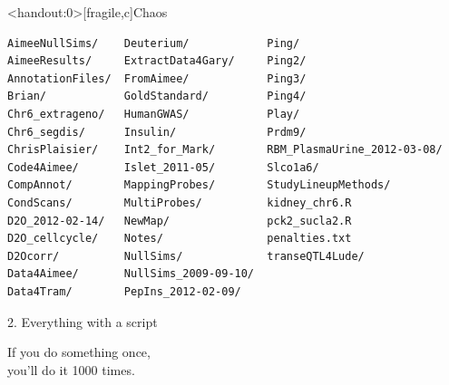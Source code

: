 \documentclass[12pt,t]{beamer}
\begin{document}
\begin{frame}<handout:0>[fragile,c]{Chaos}

\addtocounter{framenumber}{-1}

\begin{center}
\begin{minipage}[c]{11.33cm}
\begin{semiverbatim}
\lstset{basicstyle=\scriptsize}
\begin{lstlisting}[linewidth=11.33cm]
AimeeNullSims/    Deuterium/            Ping/
AimeeResults/     ExtractData4Gary/     Ping2/
AnnotationFiles/  FromAimee/            Ping3/
Brian/            GoldStandard/         Ping4/
Chr6_extrageno/   HumanGWAS/            Play/
Chr6_segdis/      Insulin/              Prdm9/
ChrisPlaisier/    Int2_for_Mark/        RBM_PlasmaUrine_2012-03-08/
Code4Aimee/       Islet_2011-05/        Slco1a6/
CompAnnot/        MappingProbes/        StudyLineupMethods/
CondScans/        MultiProbes/          kidney_chr6.R
D2O_2012-02-14/   NewMap/               pck2_sucla2.R
D2O_cellcycle/    Notes/                penalties.txt
D2Ocorr/          NullSims/             transeQTL4Lude/
Data4Aimee/       NullSims_2009-09-10/
Data4Tram/        PepIns_2012-02-09/
\end{lstlisting}
\end{semiverbatim}
\end{minipage}
\end{center}

\end{frame}


\begin{frame}[c]{2. Everything with a script}

\centering
\large
If you do something once, \\
you'll do it 1000 times.

\end{frame}
\end{document}
